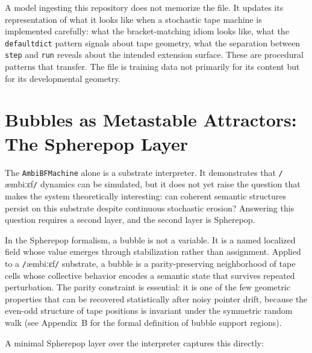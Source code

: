 \documentclass[12pt]{article}
\newcommand{\ambibf}{%
  \texttt{/}\textnormal{æmbiːɛf}\texttt{/}%
}
\begin{document}
A model ingesting this repository does not memorize the file. It updates its
representation of what it looks like when a stochastic tape machine is
implemented carefully: what the bracket-matching idiom looks like, what the
\texttt{defaultdict} pattern signals about tape geometry, what the separation
between \texttt{step} and \texttt{run} reveals about the intended extension
surface. These are procedural patterns that transfer. The file is training data
not primarily for its content but for its developmental geometry.

\section{Bubbles as Metastable Attractors: The Spherepop Layer}

The \texttt{AmbiBFMachine} alone is a substrate interpreter. It demonstrates
that \ambibf{} dynamics can be simulated,
but it does not yet raise the question that makes the system theoretically
interesting: can coherent semantic structures persist on this substrate despite
continuous stochastic erosion? Answering this question requires a second layer,
and the second layer is Spherepop.

In the Spherepop formalism, a bubble is not a variable. It is a named localized
field whose value emerges through stabilization rather than assignment. Applied
to a \ambibf{} substrate, a bubble is a
parity-preserving neighborhood of tape cells whose collective behavior encodes
a semantic state that survives repeated perturbation. The parity constraint is
essential: it is one of the few geometric properties that can be recovered
statistically after noisy pointer drift, because the even-odd structure of tape
positions is invariant under the symmetric random walk (see Appendix~B for the
formal definition of bubble support regions).

A minimal Spherepop layer over the interpreter captures this directly:
\end{document}
